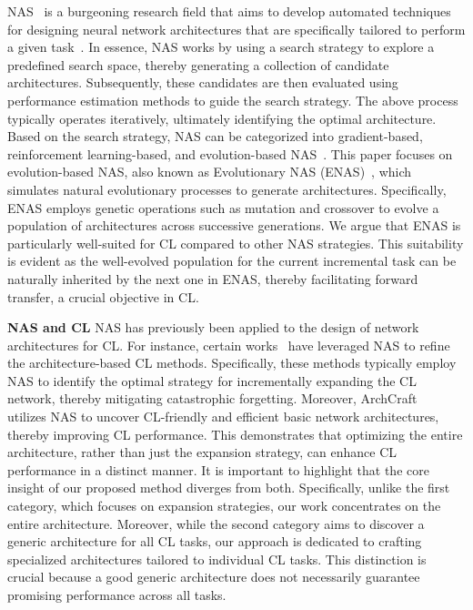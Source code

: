 NAS~\cite{zoph2016neural} is a burgeoning research field that aims to develop automated techniques for designing neural network architectures that are specifically tailored to perform a given task~\cite{nas_survey}. In essence, NAS works by using a search strategy to explore a predefined search space, thereby generating a collection of candidate architectures. Subsequently, these candidates are then evaluated using performance estimation methods to guide the search strategy. The above process typically operates iteratively, ultimately identifying the optimal architecture. Based on the search strategy, NAS can be categorized into gradient-based, reinforcement learning-based, and evolution-based NAS~\cite{nas_survey}. This paper focuses on evolution-based NAS, also known as Evolutionary NAS (ENAS)~\cite{enas_survey}, which simulates natural evolutionary processes to generate architectures. Specifically, ENAS employs genetic operations such as mutation and crossover to evolve a population of architectures across successive generations. We argue that ENAS is particularly well-suited for CL compared to other NAS strategies. This suitability is evident as the well-evolved population for the current incremental task can be naturally inherited by the next one in ENAS, thereby facilitating forward transfer, a crucial objective in CL.

\textbf{NAS and CL}
NAS has previously been applied to the design of network architectures for CL. For instance, certain works~\cite{li2019learn,wang2023task,I-DARTS} have leveraged NAS to refine the architecture-based CL methods. Specifically, these methods typically employ NAS to identify the optimal strategy for incrementally expanding the CL network, thereby mitigating catastrophic forgetting. Moreover, ArchCraft~\cite{CL_design} utilizes NAS to uncover CL-friendly and efficient basic network architectures, thereby improving CL performance. This demonstrates that optimizing the entire architecture, rather than just the expansion strategy, can enhance CL performance in a distinct manner. It is important to highlight that the core insight of our proposed method diverges from both. Specifically, unlike the first category, which focuses on expansion strategies, our work concentrates on the entire architecture. Moreover, while the second category aims to discover a generic architecture for all CL tasks, our approach is dedicated to crafting specialized architectures tailored to individual CL tasks. This distinction is crucial because a good generic architecture does not necessarily guarantee promising performance across all tasks.